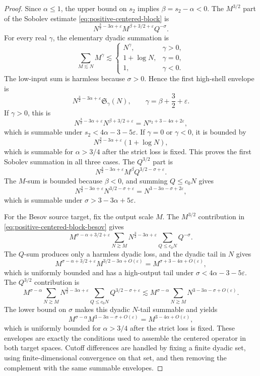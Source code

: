 \documentclass[10pt]{amsart}
\numberwithin{equation}{section}
\theoremstyle{plain}
\theoremstyle{definition}
\theoremstyle{remark}
\newcommand{\eps}{\varepsilon}
\begin{document}
\begin{proof}
Since \(\alpha\le1\), the upper bound on \(s_2\) implies \(\beta=s_2-\alpha<0\).  The \(M^{3/2}\) part of the Sobolev estimate \eqref{eq:positive-centered-block} is
\[
        N^{\frac32-3\alpha+\eps}M^{\beta+3/2+\eps}Q^{-\sigma}.
\]
For every real \(\gamma\), the elementary dyadic summation is
\[
        \sum_{M\lesssim N}M^\gamma
        \lesssim
        \begin{cases}
        N^\gamma,&\gamma>0,\\
        1+\log N,&\gamma=0,\\
        1,&\gamma<0.
        \end{cases}
\]
The low-input sum is harmless because \(\sigma>0\).  Hence the first high-shell envelope is
\[
        N^{\frac32-3\alpha+\eps}\mathfrak S_\gamma(N),
        \qquad \gamma=\beta+\frac32+\eps.
\]
If \(\gamma>0\), this is
\[
        N^{\frac32-3\alpha+\eps}N^{\beta+3/2+\eps}
        =N^{s_2+3-4\alpha+2\eps},
\]
which is summable under \(s_2<4\alpha-3-5\eps\).  If \(\gamma=0\) or \(\gamma<0\), it is bounded by
\[
        N^{\frac32-3\alpha+\eps}(1+\log N),
\]
which is summable for \(\alpha>3/4\) after the strict loss is fixed.  This proves the first Sobolev summation in all three cases.  The \(Q^{3/2}\) part is
\[
        N^{\frac32-3\alpha+\eps}M^\beta Q^{3/2-\sigma+\eps}.
\]
The \(M\)-sum is bounded because \(\beta<0\), and summing \(Q\le c_0N\) gives
\[
        N^{\frac32-3\alpha+\eps}N^{3/2-\sigma+\eps}
        =N^{3-3\alpha-\sigma+2\eps},
\]
which is summable under \(\sigma>3-3\alpha+5\eps\).

For the Besov source target, fix the output scale \(M\).  The \(M^{3/2}\) contribution in \eqref{eq:positive-centered-block-besov} gives
\[
        M^{\sigma-\alpha+3/2+\eps}
        \sum_{N\gtrsim M}N^{\frac32-3\alpha+\eps}
        \sum_{Q\le c_0N}Q^{-\sigma}.
\]
The \(Q\)-sum produces only a harmless dyadic loss, and the dyadic tail in \(N\) gives
\[
        M^{\sigma-\alpha+3/2+\eps}M^{3/2-3\alpha+O(\eps)}
        =M^{\sigma+3-4\alpha+O(\eps)},
\]
which is uniformly bounded and has a high-output tail under \(\sigma<4\alpha-3-5\eps\).  The \(Q^{3/2}\) contribution is
\[
        M^{\sigma-\alpha}
        \sum_{N\gtrsim M}N^{\frac32-3\alpha+\eps}
        \sum_{Q\le c_0N}Q^{3/2-\sigma+\eps}
        \lesssim
        M^{\sigma-\alpha}
        \sum_{N\gtrsim M}N^{3-3\alpha-\sigma+O(\eps)}.
\]
The lower bound on \(\sigma\) makes this dyadic \(N\)-tail summable and yields
\[
        M^{\sigma-\alpha}M^{3-3\alpha-\sigma+O(\eps)}
        =M^{3-4\alpha+O(\eps)},
\]
which is uniformly bounded for \(\alpha>3/4\) after the strict loss is fixed.  These envelopes are exactly the conditions used to assemble the centered operator in both target spaces.  Cutoff differences are handled by fixing a finite dyadic set, using finite-dimensional convergence on that set, and then removing the complement with the same summable envelopes.
\end{proof}
\end{document}
